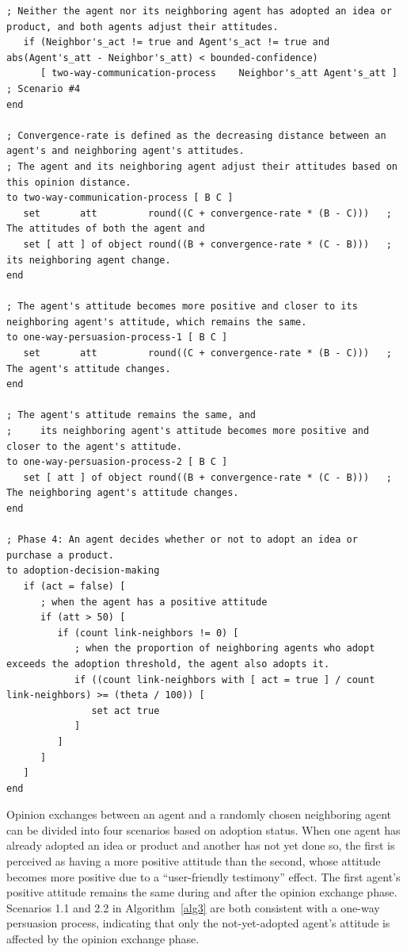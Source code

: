 \documentclass[10pt,letterpaper]{article}
\begin{document}
\begin{algorithm}[!ht]
\begin{lstlisting}[basicstyle=\ttfamily\fontsize{6.2pt}{7.2pt}\selectfont]
   ; Neither the agent nor its neighboring agent has adopted an idea or product, and both agents adjust their attitudes.
   if (Neighbor's_act != true and Agent's_act != true and abs(Agent's_att - Neighbor's_att) < bounded-confidence)
      [ two-way-communication-process    Neighbor's_att Agent's_att ]      ; Scenario #4
end

; Convergence-rate is defined as the decreasing distance between an agent's and neighboring agent's attitudes.
; The agent and its neighboring agent adjust their attitudes based on this opinion distance.
to two-way-communication-process [ B C ]
   set       att         round((C + convergence-rate * (B - C)))   ; The attitudes of both the agent and
   set [ att ] of object round((B + convergence-rate * (C - B)))   ;     its neighboring agent change.
end

; The agent's attitude becomes more positive and closer to its neighboring agent's attitude, which remains the same.
to one-way-persuasion-process-1 [ B C ]
   set       att         round((C + convergence-rate * (B - C)))   ; The agent's attitude changes.
end

; The agent's attitude remains the same, and
;     its neighboring agent's attitude becomes more positive and closer to the agent's attitude.
to one-way-persuasion-process-2 [ B C ]
   set [ att ] of object round((B + convergence-rate * (C - B)))   ; The neighboring agent's attitude changes.
end

; Phase 4: An agent decides whether or not to adopt an idea or purchase a product.
to adoption-decision-making
   if (act = false) [
      ; when the agent has a positive attitude
      if (att > 50) [
         if (count link-neighbors != 0) [
            ; when the proportion of neighboring agents who adopt exceeds the adoption threshold, the agent also adopts it.
            if ((count link-neighbors with [ act = true ] / count link-neighbors) >= (theta / 100)) [
               set act true
            ]
         ]
      ]
   ]
end
\end{lstlisting}
\end{algorithm}

Opinion exchanges between an agent and a randomly chosen neighboring agent can be divided into four scenarios based on adoption status. When one agent has already adopted an idea or product and another has not yet done so, the first is perceived as having a more positive attitude than the second, whose attitude becomes more positive due to a ``user-friendly testimony'' effect. The first agent's positive attitude remains the same during and after the opinion exchange phase. Scenarios 1.1 and 2.2 in Algorithm~\ref{alg3} are both consistent with a one-way persuasion process, indicating that only the not-yet-adopted agent's attitude is affected by the opinion exchange phase.
\end{document}
